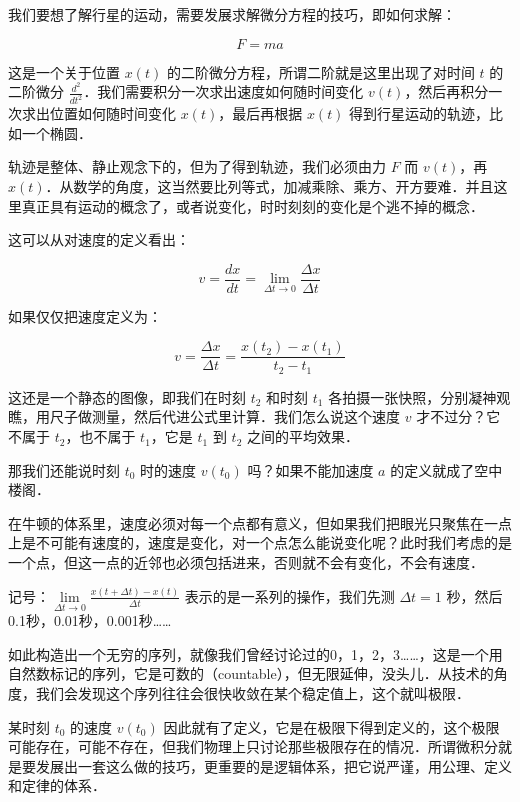 我们要想了解行星的运动，需要发展求解微分方程的技巧，即如何求解：

\begin{equation}
F=ma
\end{equation}


这是一个关于位置 $x(t)$ 的二阶微分方程，所谓二阶就是这里出现了对时间 $t$ 的二阶微分 $\frac{d^2 }{ dt^2 }$．我们需要积分一次求出速度如何随时间变化 $v(t)$，然后再积分一次求出位置如何随时间变化 $x(t)$，最后再根据 $x(t)$ 得到行星运动的轨迹，比如一个椭圆．

轨迹是整体、静止观念下的，但为了得到轨迹，我们必须由力 $F$ 而 $v(t)$，再 $x(t)$．从数学的角度，这当然要比列等式，加减乘除、乘方、开方要难．并且这里真正具有运动的概念了，或者说变化，时时刻刻的变化是个逃不掉的概念．

这可以从对速度的定义看出：

\begin{equation}
v = \frac{d x }{d t} = \lim\limits_{\Delta t \to 0} \frac{\Delta x}{\Delta t}
\end{equation}

如果仅仅把速度定义为：

\begin{equation}
v = \frac{\Delta x}{\Delta t} = \frac{ x(t_2) - x(t_1) }{ t_2 - t_1 }
\end{equation}

这还是一个静态的图像，即我们在时刻 $t_2$ 和时刻 $t_1$ 各拍摄一张快照，分别凝神观瞧，用尺子做测量，然后代进公式里计算．我们怎么说这个速度 $v$ 才不过分？它不属于 $t_2$，也不属于 $t_1$，它是 $t_1$ 到 $t_2$ 之间的平均效果．

那我们还能说时刻 $t_0$ 时的速度 $v(t_0)$ 吗？如果不能加速度 $a$ 的定义就成了空中楼阁．

在牛顿的体系里，速度必须对每一个点都有意义，但如果我们把眼光只聚焦在一点上是不可能有速度的，速度是变化，对一个点怎么能说变化呢？此时我们考虑的是一个点，但这一点的近邻也必须包括进来，否则就不会有变化，不会有速度．

记号：$\lim\limits_{\Delta t \to 0} \frac{ x(t + \Delta t) - x(t) }{\Delta t}$ 表示的是一系列的操作，我们先测 $\Delta t = 1$ 秒，然后0.1秒，0.01秒，0.001秒……

如此构造出一个无穷的序列，就像我们曾经讨论过的0，1，2，3……，这是一个用自然数标记的序列，它是可数的（countable），但无限延伸，没头儿．从技术的角度，我们会发现这个序列往往会很快收敛在某个稳定值上，这个就叫极限．


某时刻 $t_0$ 的速度 $v(t_0)$ 因此就有了定义，它是在极限下得到定义的，这个极限可能存在，可能不存在，但我们物理上只讨论那些极限存在的情况．所谓微积分就是要发展出一套这么做的技巧，更重要的是逻辑体系，把它说严谨，用公理、定义和定律的体系．

